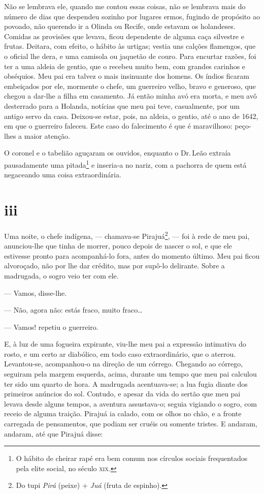 Não se lembrava ele, quando me contou essas coisas, não se lembrava
mais do número de dias que despendeu sozinho por lugares ermos, fugindo
de propósito ao povoado, não querendo ir a Olinda ou Recife, onde
estavam os holandeses. Comidas as provisões que levava, ficou dependente
de alguma caça silvestre e frutas. Deitara, com efeito, o hábito às
urtigas; vestia uns calções flamengos, que o oficial lhe dera, e uma
camisola ou jaquetão de couro. Para encurtar razões, foi ter a uma
aldeia de gentio, que o recebeu muito bem, com grandes carinhos e
obséquios. Meu pai era talvez o mais insinuante dos homens. Os índios
ficaram embeiçados por ele, mormente o chefe, um guerreiro velho, bravo
e generoso, que chegou a dar-lhe a filha em casamento. Já então minha
avó era morta, e meu avô desterrado para a Holanda, notícias que meu pai
teve, casualmente, por um antigo servo da casa. Deixou-se estar, pois,
na aldeia, o gentio, até o ano de 1642, em que o guerreiro faleceu. Este
caso do falecimento é que é maravilhoso: peço-lhes a maior atenção.

O coronel e o tabelião aguçaram os ouvidos, enquanto o Dr.\,Leão extraía
pausadamente uma pitada\footnote{O hábito de cheirar rapé era bem comum
  nos círculos sociais frequentados pela elite social, no século \textsc{xix}.} e
inseria-a no nariz, com a pachorra de quem está negaceando uma coisa
extraordinária.



\section*{iii}



Uma noite, o chefe indígena, --- chamava-se Pirajuá\footnote{Do tupi
  \emph{Pirá} (peixe) + \emph{Juá} (fruta de espinho).}, --- foi à rede
de meu pai, anunciou-lhe que tinha de morrer, pouco depois de nascer o
sol, e que ele estivesse pronto para acompanhá-lo fora, antes do momento
último. Meu pai ficou alvoroçado, não por lhe dar crédito, mas por
supô-lo delirante. Sobre a madrugada, o sogro veio ter com ele.

--- Vamos, disse-lhe.

--- Não, agora não: estás fraco, muito fraco\ldots{}

--- Vamos! repetiu o guerreiro.

E, à luz de uma fogueira expirante, viu-lhe meu pai a expressão
intimativa do rosto, e um certo ar diabólico, em todo caso
extraordinário, que o aterrou. Levantou-se, acompanhou-o na direção de
um córrego. Chegando ao córrego, seguiram pela margem esquerda, acima,
durante um tempo que meu pai calculou ter sido um quarto de hora. A
madrugada acentuava-se; a lua fugia diante dos primeiros anúncios do
sol. Contudo, e apesar da vida do sertão que meu pai levava desde alguns
tempos, a aventura assustava-o; seguia vigiando o sogro, com receio de
alguma traição. Pirajuá ia calado, com os olhos no chão, e a fronte
carregada de pensamentos, que podiam ser cruéis ou somente tristes. E
andaram, andaram, até que Pirajuá disse:

